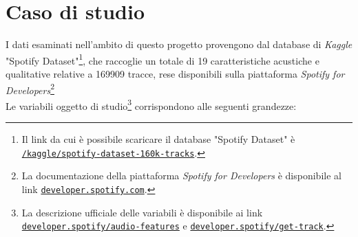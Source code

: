 \documentclass[fleqn,10pt]{SelfArx} %
\affiliation{\textsuperscript{1}\textit{794126, Dipartimento di Informatica, Sistemistica e Comunicazione}} %
\begin{document}
\flushbottom %

\maketitle %

\tableofcontents %

\thispagestyle{empty} %


\section{Caso di studio}
I dati esaminati nell'ambito di questo progetto provengono dal database di \textit{Kaggle} "Spotify Dataset"\footnote{Il link da cui è possibile scaricare il database "Spotify Dataset" è \href{https://www.kaggle.com/yamaerenay/spotify-dataset-19212020-160k-tracks}{\texttt{/kaggle/spotify-dataset-160k-tracks}}.}, che raccoglie un totale di 19 caratteristiche acustiche e qualitative relative a 169909 tracce, rese disponibili sulla piattaforma \textit{Spotify for Developers}\footnote{La documentazione della piattaforma \textit{Spotify for Developers} è disponibile al link \href{https://developer.spotify.com}{\texttt{developer.spotify.com}}.}\\
Le variabili oggetto di studio\footnote{La descrizione ufficiale delle variabili è disponibile ai link \href{https://developer.spotify.com/documentation/web-api/reference/tracks/get-audio-features/}{\texttt{developer.spotify/audio-features}} e \href{https://developer.spotify.com/documentation/web-api/reference/tracks/get-track/}{\texttt{developer.spotify/get-track}}.} corrispondono alle seguenti grandezze:
\end{document}
